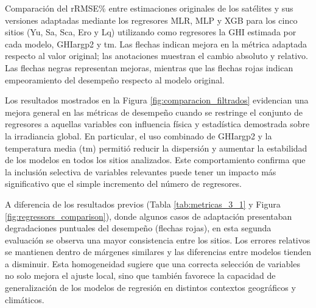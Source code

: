 \documentclass[letterpaper,12pt, twoside]{report}
\providecommand{\DIFdeltex}[1]{{\protect\color{red} \scriptsize #1}} %
\providecommand{\DIFdelFL}[1]{\DIFdel{#1}} %
\providecommand{\DIFdel}[1]{\texorpdfstring{\DIFdeltex{#1}}{}} %
\begin{document}

{%
\DIFdelFL{Comparación del rRMSE\% entre estimaciones originales de los satélites y sus versiones adaptadas mediante los regresores MLR, MLP y XGB para los cinco sitios (Yu, Sa, Sca, Ero y Lq) utilizando como regresores la GHI estimada por cada modelo, GHIargp2 y tm. Las flechas indican mejora en la métrica adaptada respecto al valor original; las anotaciones muestran el cambio absoluto y relativo. Las flechas negras representan mejoras, mientras que las flechas rojas indican empeoramiento del desempeño respecto al modelo original.}}

\DIFdel{Los resultados mostrados en la Figura \ref{fig:comparacion_filtrados} evidencian una mejora general en las métricas de desempeño cuando se restringe el conjunto de regresores a aquellas variables con influencia física y estadística demostrada sobre la irradiancia global. En particular, el uso combinado de GHIargp2 y la temperatura media (tm) permitió reducir la dispersión y aumentar la estabilidad de los modelos en todos los sitios analizados. Este comportamiento confirma que la inclusión selectiva de variables relevantes puede tener un impacto más significativo que el simple incremento del número de regresores.
}%

\DIFdel{A diferencia de los resultados previos (Tabla \ref{tab:metricas_3_1} y Figura \ref{fig:regressors_comparison}), donde algunos casos de adaptación presentaban degradaciones puntuales del desempeño (flechas rojas), en esta segunda evaluación se observa una mayor consistencia entre los sitios. Los errores relativos se mantienen dentro de márgenes similares y las diferencias entre modelos tienden a disminuir. Esta homogeneidad sugiere que una correcta selección de variables no solo mejora el ajuste local, sino que también favorece la capacidad de generalización de los modelos de regresión en distintos contextos geográficos y climáticos.
}%
\end{document}
